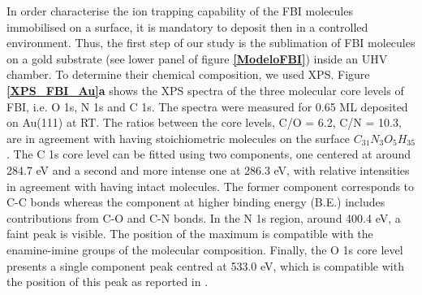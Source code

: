 \documentclass[aps,prl,reprint,longbibliography,superscriptaddress, english]{revtex4-1}
\begin{document}
In order characterise the ion trapping capability of the FBI molecules immobilised on a surface, it is mandatory to deposit then in a controlled environment. Thus, the first step of our study is the sublimation of FBI molecules on a gold substrate (see lower panel of figure {\bf \ref{ModeloFBI}}) inside an UHV chamber. To determine their chemical composition, we used XPS. Figure {\bf \ref{XPS_FBI_Au}a } shows the XPS spectra of the three molecular core levels of FBI, i.e. O 1s, N 1s and C 1s. The spectra were measured for 0.65 ML deposited on Au(111) at RT. The ratios between the core levels, C/O = 6.2, C/N = 10.3, are in agreement with having stoichiometric molecules on the surface $ C_{31}N_{3}O_{5}H_{35}$. The C 1s core level
can be fitted using two components, one {centered} at around 284.7 eV and a second and more intense one at 286.3 eV, with relative intensities in agreement with having intact molecules. The former component corresponds to C-C bonds whereas the component at higher binding energy (B.E.) includes contributions from C-O and C-N {bonds}. In the N 1s region, around 400.4 eV, a faint peak is visible. The position of the maximum is compatible with the {enamine-imine} groups of the molecular composition. Finally, the O 1s core level {presents} a single component peak centred at 533.0 eV, which is compatible with the position of this peak as reported in \cite{stredansky_-surface_2019}. 
\end{document}
